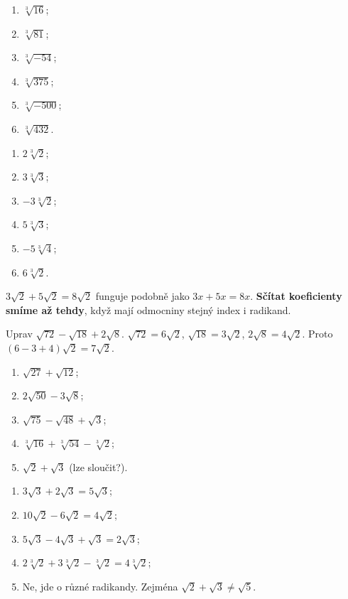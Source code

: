 \documentclass[11pt,a4paper]{article}
\begin{document}
\begin{zadaniReseniBox}[breakable=false,title={Samostatná práce 2}]
\begin{enumerate}[label=\alph*)]
\item $\sqrt[3]{16}$; \item $\sqrt[3]{81}$;
\item $\sqrt[3]{-54}$; \item $\sqrt[3]{375}$;
\item $\sqrt[3]{-500}$; \item $\sqrt[3]{432}$.
\end{enumerate}
\tcblower
\begin{enumerate}[label=\alph*)]
\item $2\sqrt[3]2$; \item $3\sqrt[3]3$;
\item $-3\sqrt[3]2$; \item $5\sqrt[3]3$;
\item $-5\sqrt[3]4$; \item $6\sqrt[3]2$.
\end{enumerate}
\end{zadaniReseniBox}

$3\sqrt2+5\sqrt2=8\sqrt2$ funguje podobně jako $3x+5x=8x$.
\textbf{Sčítat koeficienty smíme až tehdy}, když mají odmocniny stejný index i radikand.
\begin{prikladReseniBox}[breakable=false,title={Příklad 3}]
Uprav $\sqrt{72}-\sqrt{18}+2\sqrt8$.
\tcblower
$\sqrt{72}=6\sqrt2$, $\sqrt{18}=3\sqrt2$, $2\sqrt8=4\sqrt2$.
Proto $(6-3+4)\sqrt2=\boxed{7\sqrt2}$.
\end{prikladReseniBox}
\begin{zadaniReseniBox}[breakable=false,title={Samostatná práce 3}]
\begin{enumerate}[label=\alph*)]
\item $\sqrt{27}+\sqrt{12}$;
\item $2\sqrt{50}-3\sqrt8$;
\item $\sqrt{75}-\sqrt{48}+\sqrt3$;
\item $\sqrt[3]{16}+\sqrt[3]{54}-\sqrt[3]2$;
\item $\sqrt2+\sqrt3$ (lze sloučit?).
\end{enumerate}
\tcblower
\begin{enumerate}[label=\alph*)]
\item $3\sqrt3+2\sqrt3=5\sqrt3$;
\item $10\sqrt2-6\sqrt2=4\sqrt2$;
\item $5\sqrt3-4\sqrt3+\sqrt3=2\sqrt3$;
\item $2\sqrt[3]2+3\sqrt[3]2-\sqrt[3]2=4\sqrt[3]2$;
\item Ne, jde o různé radikandy. Zejména $\sqrt2+\sqrt3\ne\sqrt5$.
\end{enumerate}
\end{zadaniReseniBox}
\end{document}
